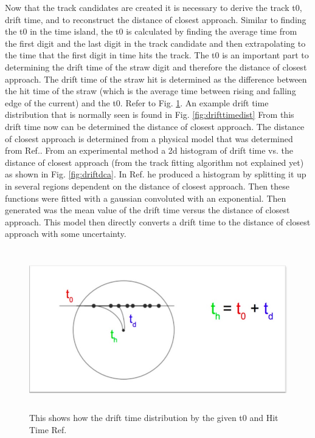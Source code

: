 \documentclass[./Thesis]{subfiles}
\begin{document}
	
	Now that the track candidates are created it is necessary to derive the track t0, drift time, and to reconstruct the distance of closest approach.  Similar to finding the t0 in the time island, the t0 is calculated by finding the average time from the first digit and the last digit in the track candidate and then extrapolating to the time that the first digit in time hits the track. The t0 is an important part to determining the drift time of the straw digit and therefore the distance of closest approach.  The drift time of the straw hit is determined as the difference between the hit time of the straw (which is the average time between rising and falling edge of the current) and the t0.  Refer to Fig. \ref{fig:drifttime}.  An example drift time distribution that is normally seen is found in Fig. \ref{fig:drifttimedist} From this drift time now can be determined the distance of closest approach.  The distance of closest approach is determined from a physical model that was determined from Ref.\cite{jMottdca}.  From an experimental method a 2d histogram of drift time vs. the distance of closest approach (from the track fitting algorithm not explained yet) as shown in Fig. \ref{fig:driftdca}.  In Ref.\cite{jMottdca} he produced a histogram by splitting it up in several regions dependent on the distance of closest approach.  Then these functions were fitted with a gaussian convoluted with an exponential.  Then generated was the mean value of the drift time versus the distance of closest approach.  This model then directly converts a drift time to the distance of closest approach with some uncertainty.	
	
\begin{figure}
	\centerline{\includegraphics[height=70mm]{drifttime.jpeg}}
	\caption[Drift Time Determination]{ This shows how the drift time distribution by the given t0 and Hit Time  Ref. \cite{trackerWiki}
	}
	\label{fig:drifttime}
\end{figure} 
	
\end{document}
